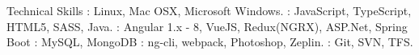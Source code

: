 \documentclass{resume}
\author{Rahmathullah M}
\begin{document}
\maketitle



\begin{category}{Technical Skills}
  : Linux, Mac OSX, Microsoft Windows.
  : JavaScript, TypeScript, HTML5, SASS, Java.
  : Angular 1.x - 8, VueJS, Redux(NGRX), ASP.Net, Spring Boot
  : MySQL, MongoDB
  : ng-cli, webpack, Photoshop, Zeplin.
  : Git, SVN, TFS.
\end{category} 

\end{document}
